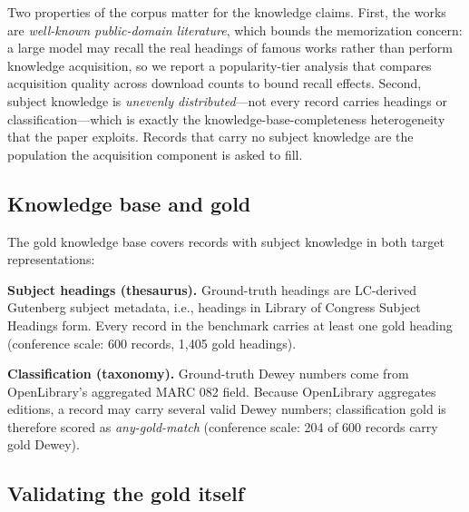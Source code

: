 Two properties of the corpus matter for the knowledge claims. First, the
works are \emph{well-known public-domain literature}, which bounds the
memorization concern: a large model may recall the real headings of famous
works rather than perform knowledge acquisition, so we report a
popularity-tier analysis that compares acquisition quality across download
counts to bound recall effects. Second, subject knowledge is
\emph{unevenly distributed}---not every record carries headings or
classification---which is exactly the knowledge-base-completeness
heterogeneity that the paper exploits. Records that carry no subject
knowledge are the population the acquisition component is asked to fill.

\subsection{Knowledge base and gold}
\label{sec:data:gold}

The gold knowledge base covers  records with subject
knowledge in both target representations:

\textbf{Subject headings (thesaurus).} Ground-truth headings are
LC-derived Gutenberg subject metadata, i.e., headings in Library of Congress
Subject Headings form. Every record in the benchmark carries at least one
gold heading (conference scale: 600 records, 1{,}405 gold headings).

\textbf{Classification (taxonomy).} Ground-truth Dewey numbers come from
OpenLibrary's aggregated MARC 082 field. Because OpenLibrary aggregates
editions, a record may carry several valid Dewey numbers; classification
gold is therefore scored as \emph{any-gold-match} (conference scale: 204 of
600 records carry gold Dewey).

\subsection{Validating the gold itself}
\label{sec:data:gold-validation}

